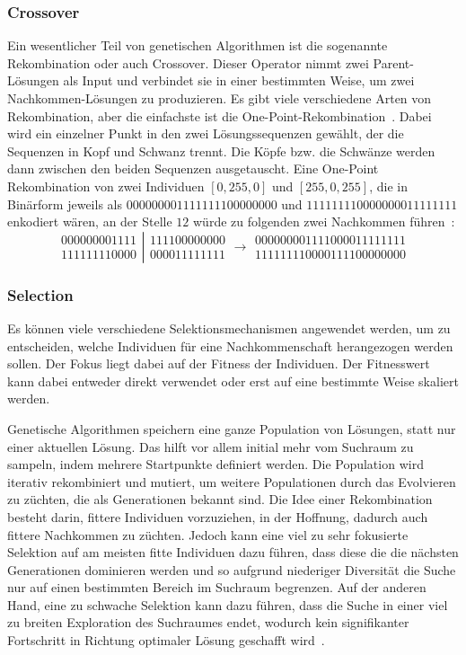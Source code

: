 \documentclass{article}
\begin{document}
\subsubsection{Crossover}
\label{sec:background-crossover}
Ein wesentlicher Teil von genetischen Algorithmen ist die sogenannte Rekombination oder auch Crossover. Dieser Operator nimmt zwei Parent-Lösungen als Input und verbindet sie in einer bestimmten Weise, um zwei Nachkommen-Lösungen zu produzieren. Es gibt viele verschiedene Arten von Rekombination, aber die einfachste ist die One-Point-Rekombination~\cite{McMinn_2004}. Dabei wird ein einzelner Punkt in den zwei Lösungssequenzen gewählt, der die Sequenzen in Kopf und Schwanz trennt. Die Köpfe bzw. die Schwänze werden dann zwischen den beiden Sequenzen ausgetauscht. Eine One-Point Rekombination von zwei Individuen $[0, 255, 0]$ und $[255, 0, 255]$, die in Binärform jeweils als $000000001111111100000000$ und $111111110000000011111111$ enkodiert wären, an der Stelle $12$ würde zu folgenden zwei Nachkommen führen~\cite{McMinn_2004}:
\[
\left.\begin{array}{c}
000000001111 \\  %
111111110000 %
\end{array}\right| 
\begin{array}{c}
111100000000 \\  %
000011111111 %
\end{array} \longrightarrow
\begin{array}{c}
000000001111000011111111 \\  %
111111110000111100000000 %
\end{array}
\]


\subsubsection{Selection}
Es können viele verschiedene Selektionsmechanismen angewendet werden, um zu entscheiden, welche Individuen für eine Nachkommenschaft herangezogen werden sollen. Der Fokus liegt dabei auf der Fitness der Individuen. Der Fitnesswert kann dabei entweder direkt verwendet oder erst auf eine bestimmte Weise skaliert werden. 

Genetische Algorithmen speichern eine ganze Population von Lösungen, statt nur einer aktuellen Lösung. Das hilft vor allem initial mehr vom Suchraum zu sampeln, indem mehrere Startpunkte definiert werden. Die Population wird iterativ rekombiniert und mutiert, um weitere Populationen durch das Evolvieren zu züchten, die als Generationen bekannt sind. Die Idee einer Rekombination besteht darin, fittere Individuen vorzuziehen, in der Hoffnung, dadurch auch fittere Nachkommen zu züchten. Jedoch kann eine viel zu sehr fokusierte Selektion auf am meisten fitte Individuen dazu führen, dass diese die die nächsten Generationen dominieren werden und so aufgrund niederiger Diversität die Suche nur auf einen bestimmten Bereich im Suchraum begrenzen. Auf der anderen Hand, eine zu schwache Selektion kann dazu führen, dass die Suche in einer viel zu breiten Exploration des Suchraumes endet, wodurch kein signifikanter Fortschritt in Richtung optimaler Lösung geschafft wird~\cite{McMinn_2004}. 
\end{document}
